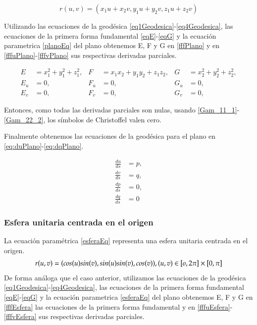 \documentclass{endm}
\begin{document}
\begin{equation} \label{planoEq}
r(u,v) = (x_1 u + x_2 v, y_1 u + y_2 v, z_1 u + z_2 v)
\end{equation}

Utilizando las ecuaciones de la geod\'esica \ref{eq1Geodesica}-\ref{eq4Geodesica}, las ecuaciones de la primera forma fundamental \ref{eqE}-\ref{eqG} y la ecuaci\'on parametrica \ref{planoEq} del plano obtenemos E, F y G en \ref{fffPlano}  y en \ref{fffuPlano}-\ref{fffvPlano} sus respectivas derivadas parciales.

\begin{align} 
E&=x_1^2 + y_1^2 + z_1^2,   & F &=x_1 x_2 + y_1 y_2 + z_1 z_2,   & G&=x_2^2 + y_2^2 + z_2^2, \label{fffPlano} \\
E_u&=0,     & F_u&=0,   & G_u&=0, \label{fffuPlano}\\
E_v&=0,    & F_v&=0,   & G_v&=0, \label{fffvPlano}
\end{align}

Entonces, como todas las derivadas parciales son nulas, usando \ref{Gam_11_1}-\ref{Gam_22_2}, los s\'imbolos de Christoffel valen cero.

Finalmente obtenemos las ecuaciones de la geod\'esica para el plano en \ref{eq:duPlano}-\ref{eq:dqPlano}.

\begin{align}
\frac{du}{ds}&=p,\label{eq:duPlano} \\
\frac{dv}{ds}&=q,\label{eq:dvPlano}     \\
\frac{dp}{ds}&=0, \label{eq:dpPlano}\\ 
\frac{dq}{ds}&=0 \label{eq:dqPlano}
\end{align}

\subsubsection{Esfera unitaria centrada en el origen}

La ecuaci\'on param\'etrica \ref{esferaEq} representa una esfera unitaria centrada en el origen.
\begin{equation} \label{esferaEq}
r(u,v) = (cos (u) sin(v), sin (u) sin (v),cos (v)), \\
(u,v) \in  [o, 2 \pi] \times [0, \pi]
\end{equation}
De forma an\'aloga que el caso anterior, utilizamos las ecuaciones de la geod\'esica \ref{eq1Geodesica}-\ref{eq4Geodesica}, las ecuaciones de la primera forma fundamental \ref{eqE}-\ref{eqG} y la ecuaci\'on parametrica \ref{esferaEq} del plano obtenemos E, F y G en \ref{fffEsfera} las ecuaciones de la primera forma fundamental y en \ref{fffuEsfera}-\ref{fffvEsfera} sus respectivas derivadas parciales.
\end{document}
